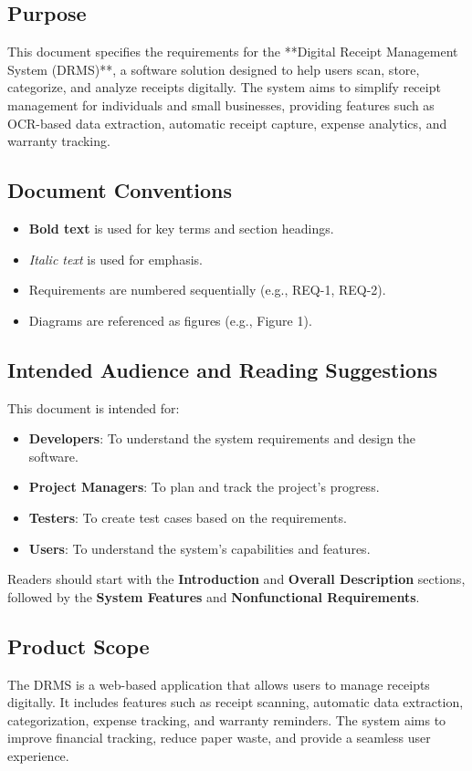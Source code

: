 \documentclass[12pt]{article}
\begin{document}
\subsection{Purpose}
This document specifies the requirements for the **Digital Receipt Management System (DRMS)**, a software solution designed to help users scan, store, categorize, and analyze receipts digitally. The system aims to simplify receipt management for individuals and small businesses, providing features such as OCR-based data extraction, automatic receipt capture, expense analytics, and warranty tracking.

\subsection{Document Conventions}
\begin{itemize}
    \item \textbf{Bold text} is used for key terms and section headings.
    \item \textit{Italic text} is used for emphasis.
    \item Requirements are numbered sequentially (e.g., REQ-1, REQ-2).
    \item Diagrams are referenced as figures (e.g., Figure 1).
\end{itemize}

\subsection{Intended Audience and Reading Suggestions}
This document is intended for:
\begin{itemize}
    \item \textbf{Developers}: To understand the system requirements and design the software.
    \item \textbf{Project Managers}: To plan and track the project's progress.
    \item \textbf{Testers}: To create test cases based on the requirements.
    \item \textbf{Users}: To understand the system's capabilities and features.
\end{itemize}
Readers should start with the \textbf{Introduction} and \textbf{Overall Description} sections, followed by the \textbf{System Features} and \textbf{Nonfunctional Requirements}.

\subsection{Product Scope}
The DRMS is a web-based application that allows users to manage receipts digitally. It includes features such as receipt scanning, automatic data extraction, categorization, expense tracking, and warranty reminders. The system aims to improve financial tracking, reduce paper waste, and provide a seamless user experience.
\end{document}
